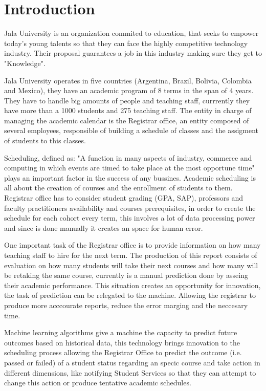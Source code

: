 \section{Introduction}

Jala University is an organization commited to education, that seeks to empower today's young talents so that they can face the highly competitive technology industry. Their proposal guarantees a job in this industry making sure they get to "Knowledge".

Jala University operates in five countries (Argentina, Brazil, Bolivia, Colombia and Mexico), they have an academic program of 8 terms in the span of 4 years. They have to handle big amounts of people and teaching staff, currrently they have more than a 1000 students and 275 teaching staff. The entity in charge of managing the academic calendar is the Registrar office, an entity composed of several employees, responsible of building a schedule of classes and the assigment of students to this classes.

Scheduling, defined as: "A function in many aspects of industry, commerce and computing in which events are timed to take place at the most opportune time" plays an important factor in the success of any bussines. Academic scheduling is all about the creation of courses and the enrollment of students to them. Registrar office has to consider student grading (GPA, SAP), professors and faculty practitioners availability and courses prerequisites, in order to create the schedule for each cohort \textcite{A cohort is a generation of students} every term, this involves a lot of data processing power and since is done manually it creates an space for human error.

One important task of the Registrar office is to provide information on how many teaching staff to hire for the next term. The production of this report consists of evaluation on how many students will take their next courses and how many will be retaking the same course, currently is a manual prediction done by asseing their academic performance. This situation creates an opportunity for innovation, the task of prediction can be relegated to the machine. Allowing the registrar to produce more acccourate reports, reduce the error marging and the neccesary time.

Machine learning algorithms give a machine the capacity to predict future outcomes based on historical data, this technology brings innovation to the scheduling process allowing the Registrar Office to predict the outcome (i.e. passed or failed) of a student status regarding an specic course and take action in different dimensions, like notifying Student Services so that they can attempt to change this action or produce tentative academic schedules.

